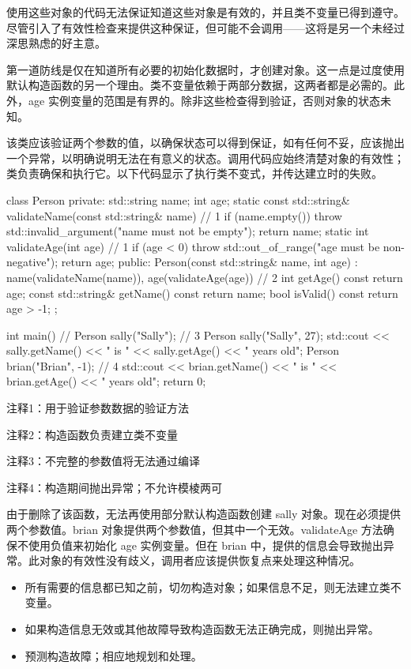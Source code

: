 
使用这些对象的代码无法保证知道这些对象是有效的，并且类不变量已得到遵守。尽管引入了有效性检查来提供这种保证，但可能不会调用——这将是另一个未经过深思熟虑的好主意。


第一道防线是仅在知道所有必要的初始化数据时，才创建对象。这一点是过度使用默认构造函数的另一个理由。类不变量依赖于两部分数据，这两者都是必需的。此外，age 实例变量的范围是有界的。除非这些检查得到验证，否则对象的状态未知。

该类应该验证两个参数的值，以确保状态可以得到保证，如有任何不妥，应该抛出一个异常，以明确说明无法在有意义的状态。调用代码应始终清楚对象的有效性；类负责确保和执行它。以下代码显示了执行类不变式，并传达建立时的失败。


\begin{cpp}
class Person {
private:
  std::string name;
  int age;
  static const std::string& validateName(const std::string& name) { // 1
    if (name.empty())
      throw std::invalid_argument("name must not be empty");
    return name;
  }
  static int validateAge(int age) { // 1
    if (age < 0)
      throw std::out_of_range("age must be non-negative");
    return age;
  }
public:
  Person(const std::string& name, int age) :
    name(validateName(name)), age(validateAge(age)) {} // 2
  int getAge() const { return age; }
  const std::string& getName() const { return name; }
  bool isValid() const { return age > -1; }
};

int main() {
  // Person sally("Sally"); // 3
  Person sally("Sally", 27);
  std::cout << sally.getName() << " is " << sally.getAge()
    << " years old\n";
  Person brian("Brian", -1); // 4
  std::cout << brian.getName() << " is " << brian.getAge()
    << " years old\n";
  return 0;
}
\end{cpp}

{\footnotesize
注释1：用于验证参数数据的验证方法

注释2：构造函数负责建立类不变量

注释3：不完整的参数值将无法通过编译

注释4：构造期间抛出异常；不允许模棱两可
}

由于删除了该函数，无法再使用部分默认构造函数创建 sally 对象。现在必须提供两个参数值。brian 对象提供两个参数值，但其中一个无效。validateAge 方法确保不使用负值来初始化 age 实例变量。但在 brian 中，提供的信息会导致抛出异常。此对象的有效性没有歧义，调用者应该提供恢复点来处理这种情况。


\begin{itemize}
\item
所有需要的信息都已知之前，切勿构造对象；如果信息不足，则无法建立类不变量。

\item
如果构造信息无效或其他故障导致构造函数无法正确完成，则抛出异常。

\item
预测构造故障；相应地规划和处理。
\end{itemize}








